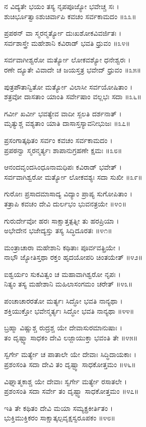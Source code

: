 ನ ವಿದ್ಯತೇ ಭಯಂ ತಸ್ಯ ನೃಪಪೂಜ್ಯೋ ಭವೇಚ್ಚ ಸಃ ।\\
ಶುಚಿರ್ಭೂತ್ವಾಽಶುಚಿರ್ವಾಪಿ ಕವಚಂ ಸರ್ವಕಾಮದಂ ॥೩೩॥

ಪ್ರಪಠನ್ ವಾ ಸ್ಮರನ್ಮರ್ತ್ಯೋ ದುಃಖಶೋಕವಿವರ್ಜಿತಃ ।\\
ಸರ್ವಶಾಸ್ತ್ರೇ ಮಹೇಶಾನಿ ಕವಿರಾಡ್ ಭವತಿ ಧ್ರುವಂ ॥೩೪॥

ಸರ್ವವಾಗೀಶ್ವರೋ ಮರ್ತ್ಯೋ ಲೋಕವಶ್ಯೋ ಧನೇಶ್ವರಃ ।\\
ರಣೇ ದ್ಯೂತೇ ವಿವಾದೇ ಚ ಜಯಸ್ತತ್ರ ಭವೇದ್ ಧ್ರುವಂ ॥೩೫॥

ಪುತ್ರಪೌತಾನ್ವಿತೋ ಮರ್ತ್ಯೋ ವಿಲಾಸೀ ಸರ್ವಯೋಷಿತಾಂ ।\\
ಶತ್ರವೋ ದಾಸತಾಂ ಯಾಂತಿ ಸರ್ವೇಷಾಂ ವಲ್ಲಭಃ ಸದಾ ॥೩೬॥

ಗರ್ವೀ ಖರ್ವೀ ಭವತ್ಯೇವ ವಾದೀ ಸ್ಖಲತಿ ದರ್ಶನಾತ್ ।\\
ಮೃತ್ಯುಶ್ಚ ವಶ್ಯತಾಂ ಯಾತಿ ದಾಸಾಸ್ತಸ್ಯಾವನೀಭುಜಃ ॥೩೭॥

ಪ್ರಸಂಗಾತ್ಕಥಿತಂ ಸರ್ವಂ ಕವಚಂ ಸರ್ವಕಾಮದಂ ।\\
ಪ್ರಪಠನ್ವಾ ಸ್ಮರನ್ಮರ್ತ್ಯಃ ಶಾಪಾನುಗ್ರಹಣೇ ಕ್ಷಮಃ ॥೩೮॥

ಆನಂದವೃಂದಸಿಂಧೂನಾಮಧಿಪಃ ಕವಿರಾಡ್ ಭವೇತ್ ।\\
ಸರ್ವವಾಗಿಶ್ವರೋ ಮರ್ತ್ಯೋ ಲೋಕವಶ್ಯಃ ಸದಾ ಸುಖೀ ॥೩೯॥

ಗುರೋಃ ಪ್ರಸಾದಮಾಸಾದ್ಯ ವಿದ್ಯಾಂ ಪ್ರಾಪ್ಯ ಸುಗೋಪಿತಾಂ ।\\
ತತ್ರಾಪಿ ಕವಚಂ ದೇವಿ ದುರ್ಲಭಂ ಭುವನತ್ರಯೇ ॥೪೦॥

ಗುರುರ್ದೇವೋ ಹರಃ ಸಾಕ್ಷಾತ್ತತ್ಪತ್ನೀ ತು ಹರಪ್ರಿಯಾ ।\\
ಅಭೇದೇನ ಭಜೇದ್ಯಸ್ತು ತಸ್ಯ ಸಿದ್ಧಿದೂರತಃ ॥೪೧॥

ಮಂತ್ರಾಚಾರಾ ಮಹೇಶಾನಿ ಕಥಿತಾಃ ಪೂರ್ವವತ್ಪ್ರಿಯೇ ।\\
ನಾಭೌ ಜ್ಯೋತಿಸ್ತಥಾ ರಕ್ತಂ ಹೃದಯೋಪರಿ ಚಿಂತಯೇತ್ ॥೪೨॥

ಐಶ್ವರ್ಯಂ ಸುಕವಿತ್ವಂ ಚ ಮಹಾವಾಗಿಶ್ವರೋ ನೃಪಃ ।\\
ನಿತ್ಯಂ ತಸ್ಯ ಮಹೇಶಾನಿ ಮಹಿಲಾಸಂಗಮಂ ಚರೇತ್ ॥೪೩॥

ಪಂಚಾಚಾರರತೋ ಮರ್ತ್ಯಃ ಸಿದ್ಧೋ ಭವತಿ ನಾನ್ಯಥಾ ।\\
ಶಕ್ತಿಯುಕ್ತೋ ಭವೇನ್ಮರ್ತ್ಯಃ ಸಿದ್ಧೋ ಭವತಿ ನಾನ್ಯಥಾ ॥೪೪॥

ಬ್ರಹ್ಮಾ ವಿಷ್ಣುಶ್ಚ ರುದ್ರಶ್ಚ ಯೇ ದೇವಾಸುರಮಾನುಷಾಃ ।\\
ತಂ ದೃಷ್ಟ್ವಾ ಸಾಧಕಂ ದೇವಿ ಲಜ್ಜಾಯುಕ್ತಾ ಭವಂತಿ ತೇ ॥೪೫॥

ಸ್ವರ್ಗೇ ಮರ್ತ್ಯೇ ಚ ಪಾತಾಲೇ ಯೇ ದೇವಾಃ ಸಿದ್ಧಿದಾಯಕಾಃ ।\\
ಪ್ರಶಂಸಂತಿ ಸದಾ ದೇವಿ ತಂ ದೃಷ್ಟ್ವಾ ಸಾಧಕೋತ್ತಮಂ ॥೪೬॥

ವಿಘ್ನಾತ್ಮಕಾಶ್ಚ ಯೇ ದೇವಾಃ ಸ್ವರ್ಗೇ ಮರ್ತ್ಯೇ ರಸಾತಲೇ ।\\
ಪ್ರಶಂಸಂತಿ ಸದಾ ಸರ್ವೇ ತಂ ದೃಷ್ಟ್ವಾ ಸಾಧಕೋತ್ತಮಂ ॥೪೭॥

ಇತಿ ತೇ ಕಥಿತಂ ದೇವಿ ಮಯಾ ಸಮ್ಯಕ್ಪ್ರಕೀರ್ತಿತಂ ।\\
ಭುಕ್ತಿಮುಕ್ತಿಕರಂ ಸಾಕ್ಷಾತ್ಕಲ್ಪವೃಕ್ಷಸ್ವರೂಪಕಂ ॥೪೮॥

